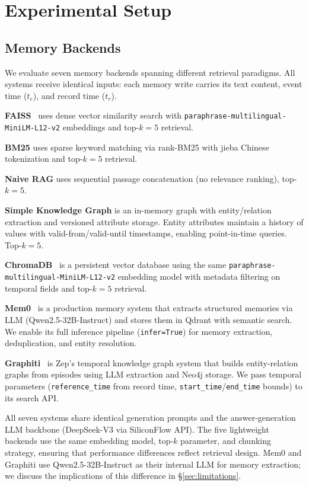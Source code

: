 \section{Experimental Setup}

\subsection{Memory Backends}
We evaluate seven memory backends spanning different retrieval paradigms.
All systems receive identical inputs: each memory write carries its text content, event time ($t_e$), and record time ($t_r$).

\textbf{FAISS}~\citep{johnson2019faiss} uses dense vector similarity search with \texttt{paraphrase-multilingual-MiniLM-L12-v2} embeddings and top-$k{=}5$ retrieval.

\textbf{BM25} uses sparse keyword matching via rank-BM25 with jieba Chinese tokenization and top-$k{=}5$ retrieval.

\textbf{Naive RAG} uses sequential passage concatenation (no relevance ranking), top-$k{=}5$.

\textbf{Simple Knowledge Graph} is an in-memory graph with entity/relation extraction and versioned attribute storage. Entity attributes maintain a history of values with valid-from/valid-until timestamps, enabling point-in-time queries. Top-$k{=}5$.

\textbf{ChromaDB}~\citep{chromadb2023} is a persistent vector database using the same \texttt{paraphrase-multilingual-MiniLM-L12-v2} embedding model with metadata filtering on temporal fields and top-$k{=}5$ retrieval.

\textbf{Mem0}~\citep{mem02025} is a production memory system that extracts structured memories via LLM (Qwen2.5-32B-Instruct) and stores them in Qdrant with semantic search. We enable its full inference pipeline (\texttt{infer=True}) for memory extraction, deduplication, and entity resolution.

\textbf{Graphiti}~\citep{graphiti2025} is Zep's temporal knowledge graph system that builds entity-relation graphs from episodes using LLM extraction and Neo4j storage. We pass temporal parameters (\texttt{reference\_time} from record time, \texttt{start\_time}/\texttt{end\_time} bounds) to its search API.

All seven systems share identical generation prompts and the answer-generation LLM backbone (DeepSeek-V3 via SiliconFlow API).
The five lightweight backends use the same embedding model, top-$k$ parameter, and chunking strategy, ensuring that performance differences reflect retrieval design.
Mem0 and Graphiti use Qwen2.5-32B-Instruct as their internal LLM for memory extraction; we discuss the implications of this difference in \S\ref{sec:limitations}.

